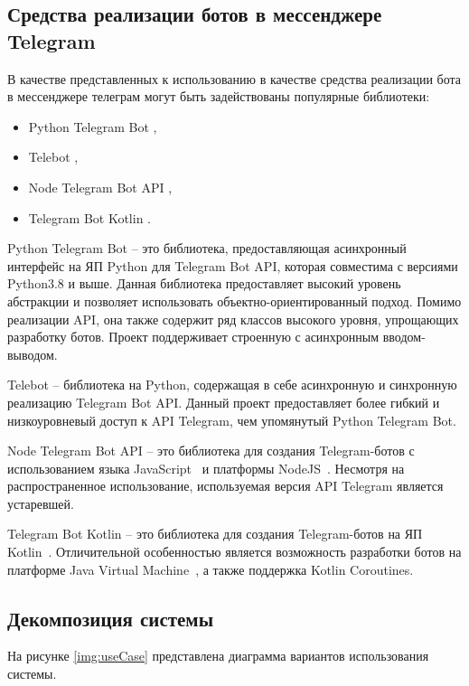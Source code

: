 \subsection{Средства реализации ботов в мессенджере Telegram}

В качестве представленных к использованию в качестве средства реализации бота в мессенджере телеграм могут быть задействованы популярные библиотеки:

\begin{itemize}
	\item Python Telegram Bot \cite{pythonTelegram},
	\item Telebot \cite{telebot},
	\item Node Telegram Bot API \cite{nodeTelegram},
	\item Telegram Bot Kotlin \cite{kotlinTelegram}.
\end{itemize}

Python Telegram Bot -- это библиотека, предоставляющая асинхронный интерфейс на ЯП Python для Telegram Bot API, которая совместима с версиями Python3.8 \cite{Python} и выше. 
Данная библиотека предоставляет высокий уровень абстракции и позволяет использовать объектно-ориентированный подход. 
Помимо реализации API, она также содержит ряд классов высокого уровня, упрощающих разработку ботов. 
Проект поддерживает строенную с асинхронным вводом-выводом.~\cite{pythonTelegram}

Telebot -- библиотека на Python, содержащая в себе асинхронную и синхронную реализацию Telegram Bot API. 
Данный проект предоставляет более гибкий и низкоуровневый доступ к API Telegram, чем упомянутый Python Telegram Bot.~\cite{telebot}

Node Telegram Bot API -- это библиотека для создания Telegram-ботов с использованием языка JavaScript~\cite{js} и платформы NodeJS~\cite{nodejs}. 
Несмотря на распространенное использование, используемая версия API Telegram является устаревшей.~\cite{nodeTelegram}

Telegram Bot Kotlin -- это библиотека для создания Telegram-ботов на ЯП Kotlin~\cite{Kotlin}. 
Отличительной особенностью является возможность разработки ботов на платформе Java Virtual Machine~\cite{jvm}, а также поддержка Kotlin Coroutines.~\cite{kotlinTelegram}

\subsection{Декомпозиция системы}

На рисунке \ref{img:useCase} представлена диаграмма вариантов использования системы.

